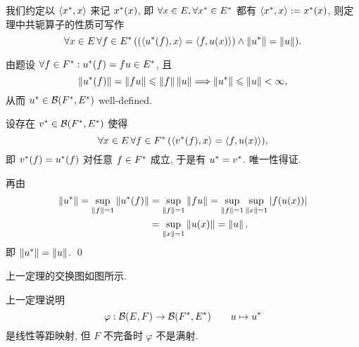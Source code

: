     我们约定以 $ \left\langle x^{*}, x \right\rangle $ 来记 $ x^{*}(x) $, 即 $ \forall x\in E, \forall x^{*}\in E^{*} $ 都有 $ \left\langle x^{*}, x \right\rangle:=x^{*}(x) $, 则定理中共轭算子的性质可写作
    \[
        \forall x\in E\,\forall f\in E^{*}\,((\left\langle u^{*}(f), x \right\rangle=\left\langle f, u(x) \right\rangle)\land\left\| u^{*} \right\|=\left\| u \right\|).
    \]
    \begin{Proof}
        由题设 $ \forall f\in F^{*}: u^{*}(f)=fu\in E^{*} $, 且
        \[
            \left\| u^{*}(f) \right\|=\left\| fu \right\|\leqslant\left\| f \right\|\left\| u \right\|\Longrightarrow\left\| u^{*} \right\|\leqslant\left\| u \right\|<\infty,
        \]
        从而 $ u^{*}\in\mathcal{B}(F^{*}, E^{*}) $ well-defined.

        设存在 $ v^{*}\in\mathcal{B}(F^{*}, E^{*}) $ 使得
        \[
            \forall x\in E\,\forall f\in F^{*}\,(\left\langle v^{*}(f), x \right\rangle=\left\langle f, u(x) \right\rangle),
        \]
        即 $ v^{*}(f)=u^{*}(f) $ 对任意 $ f\in F^{*} $ 成立, 于是有 $ u^{*}=v^{*} $. 唯一性得证.

        再由
        \[
            \begin{aligned}
                \left\| u^{*} \right\|=\sup_{\left\| f \right\|=1}\left\| u^{*}(f) \right\| & = \sup_{\left\| f \right\|=1}\left\| fu \right\|=\sup_{\left\| f \right\|=1}\sup_{\left\| x \right\|=1}\left| f(u(x)) \right| \\
                & = \sup_{\left\| x \right\|=1}\left\| u(x) \right\|=\left\| u \right\|.
            \end{aligned}
        \]
        即 $ \left\| u^{*} \right\|=\left\| u \right\| $. \qed
    \end{Proof}
    
    上一定理的交换图如图所示.
        \begin{center}
        \end{center}
    \begin{Remark}
        上一定理说明
        \[
            \varphi:\mathcal{B}(E, F)\to \mathcal{B}(F^{*}, E^{*})\qquad u\mapsto u^{*}
        \]
        是线性等距映射, 但 $ F $ 不完备时 $ \varphi $ 不是满射.
    \end{Remark}

